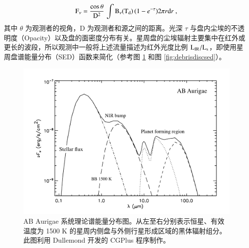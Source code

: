 \begin{equation} \label{eq:diskrad}
\mathrm{F}_\nu = \frac{\cos \theta}{\mathrm{D}^2} \, \int \mathrm{B}_\nu (\mathrm{T}_\mathrm{d}) \, ( 1-e^{-\tau} ) 2\pi r \mathrm{d} r \ ,  
\end{equation} %
其中 $\theta$ 为观测者的视角，D 为观测者和源之间的距离。光深 $\tau$ 与盘内尘埃的不透明度（Opacity）以及盘的面密度分布有关。星周盘的尘埃辐射主要集中在红外或更长的波段，所以观测中一般将上述流量描述为红外光度比例 $\mathrm{L}_\mathrm{IR}/\mathrm{L}_\mathrm{s}$，即使用星周盘谱能量分布（SED）函数来简化（参考图 \ref{fig:transdiscsed} 和图 \ref{fig:debrisdiscsed}）。


\begin{figure}[t]
\centering
\includegraphics[width=1.0\textwidth]{figures/chapter3/f3_youngdisc.pdf}
\caption[AB Aurigae 系统理论谱能量分布图。从左至右分别表示恒星、有效温度为 1500 K 的星周内侧盘与外侧行星形成区域的黑体辐射组分。该图利用 Dullemond 开发的 CGPlus 程序制作。]{AB Aurigae 系统理论谱能量分布图。从左至右分别表示恒星、有效温度为 1500 K 的星周内侧盘与外侧行星形成区域的黑体辐射组分。此图利用 Dullemond 开发的 CGPlus 程序\footnotemark[1]制作。}
\label{fig:transdiscsed}
\setcounter{footnote}{1}
\addtocounter{footnote}{+0}
\end{figure}


